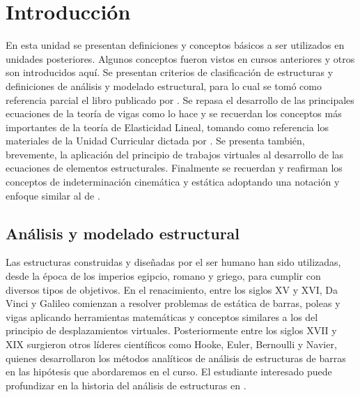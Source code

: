 %
%
%
%
\chapter[Introducción]{Introducción}

En esta unidad se presentan definiciones y conceptos básicos a ser utilizados en unidades posteriores. %
%
Algunos conceptos fueron vistos en cursos anteriores y otros son introducidos aquí. %
%
Se presentan criterios de clasificación de estructuras y definiciones de análisis y modelado estructural, para lo cual se tomó como referencia parcial el libro publicado por \cite{Hibbeler2012}. %
%
Se repasa el desarrollo de las principales ecuaciones de la teoría de vigas como lo hace \cite{Timoshenko1940a} y se recuerdan los conceptos más importantes de la teoría de Elasticidad Lineal, tomando como referencia los materiales de la Unidad Curricular dictada por \cite{CanelasElasticidad}. %
%
Se presenta también, brevemente, la aplicación del principio de trabajos virtuales al desarrollo de las ecuaciones de elementos estructurales.
%
Finalmente se recuerdan y reafirman los conceptos de indeterminación cinemática y estática adoptando una notación y enfoque similar al de \citep{CerveraRuiz2002,CerveraRuiz2002ii}. %
%

\section{Análisis y modelado estructural}

Las estructuras construidas y diseñadas por el ser humano han sido utilizadas, desde la época de los imperios egipcio, romano y griego, para cumplir con diversos tipos de objetivos. %
%
En el renacimiento, entre los siglos XV y XVI, Da Vinci y Galileo comienzan a resolver problemas de estática de barras, poleas y vigas aplicando herramientas matemáticas y conceptos similares a los del principio de desplazamientos virtuales. %
%
Posteriormente entre los siglos XVII y XIX surgieron otros líderes científicos como Hooke, Euler, Bernoulli y Navier, quienes desarrollaron los métodos analíticos de análisis de estructuras de barras en las hipótesis que abordaremos en el curso. %
%
El estudiante interesado puede profundizar en la historia del análisis de estructuras en \citep{Timoshenko1953}. %

